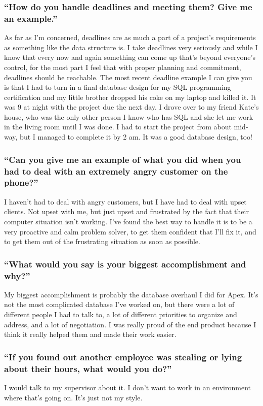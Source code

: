 \subsubsection*{``How do you handle deadlines and meeting them? Give me an example.''}
\break As far as I'm concerned, deadlines are as much a part of a project's requirements as something like the data structure is. I take deadlines very seriously and while I know that every now and again something can come up that's beyond everyone's control, for the most part I feel that with proper planning and commitment, deadlines should be reachable. The most recent deadline example I can give you is that I had to turn in a final database design for my SQL programming certification and my little brother dropped his coke on my laptop and killed it. It was 9 at night with the project due the next day. I drove over to my friend Kate's house, who was the only other person I know who has SQL and she let me work in the living room until I was done. I had to start the project from about mid-way, but I managed to complete it by 2 am. It was a good database design, too!

\subsubsection*{``Can you give me an example of what you did when you had to deal with an extremely angry customer on the phone?''}
\break I haven't had to deal with angry customers, but I have had to deal with upset clients. Not upset with me, but just upset and frustrated by the fact that their computer situation isn't working. I've found the best way to handle it is to be a very proactive and calm problem solver, to get them confident that I'll fix it, and to get them out of the frustrating situation as soon as possible.

\subsubsection*{``What would you say is your biggest accomplishment and why?''}
\break My biggest accomplishment is probably the database overhaul I did for Apex. It's not the most complicated database I've worked on, but there were a lot of different people I had to talk to, a lot of different priorities to organize and address, and a lot of negotiation. I was really proud of the end product because I think it really helped them and made their work easier.

\subsubsection*{``If you found out another employee was stealing or lying about their hours, what would you do?''}
\break I would talk to my supervisor about it. I don't want to work in an environment where that's going on. It's just not my style.

